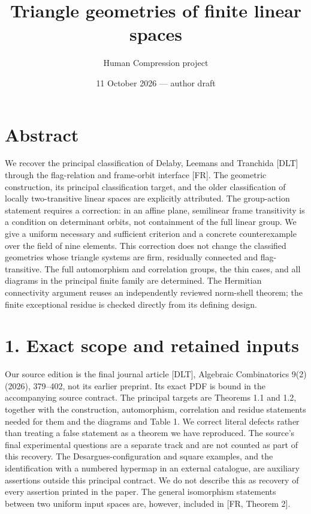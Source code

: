 \documentclass[
  11pt,
  a4paper,
]{article}
\title{Triangle geometries of finite linear spaces}
\author{Human Compression project}
\date{11 October 2026 --- author draft}
\begin{document}
\maketitle

\section{Abstract}\label{abstract}

We recover the principal classification of Delaby, Leemans and Tranchida
{[}DLT{]} through the flag-relation and frame-orbit interface {[}FR{]}.
The geometric construction, its principal classification target, and the
older classification of locally two-transitive linear spaces are
explicitly attributed. The group-action statement requires a correction:
in an affine plane, semilinear frame transitivity is a condition on
determinant orbits, not containment of the full linear group. We give a
uniform necessary and sufficient criterion and a concrete counterexample
over the field of nine elements. This correction does not change the
classified geometries whose triangle systems are firm, residually
connected and flag-transitive. The full automorphism and correlation
groups, the thin cases, and all diagrams in the principal finite family
are determined. The Hermitian connectivity argument reuses an
independently reviewed norm-shell theorem; the finite exceptional
residue is checked directly from its defining design.

\section{1. Exact scope and retained
inputs}\label{exact-scope-and-retained-inputs}

Our source edition is the final journal article {[}DLT{]}, Algebraic
Combinatorics 9(2) (2026), 379--402, not its earlier preprint. Its exact
PDF is bound in the accompanying source contract. The principal targets
are Theorems 1.1 and 1.2, together with the construction, automorphism,
correlation and residue statements needed for them and the diagrams and
Table 1. We correct literal defects rather than treating a false
statement as a theorem we have reproduced. The source's final
experimental questions are a separate track and are not counted as part
of this recovery. The Desargues-configuration and square examples, and
the identification with a numbered hypermap in an external catalogue,
are auxiliary assertions outside this principal contract. We do not
describe this as recovery of every assertion printed in the paper. The
general isomorphism statements between two uniform input spaces are,
however, included in {[}FR, Theorem 2{]}.
\end{document}

